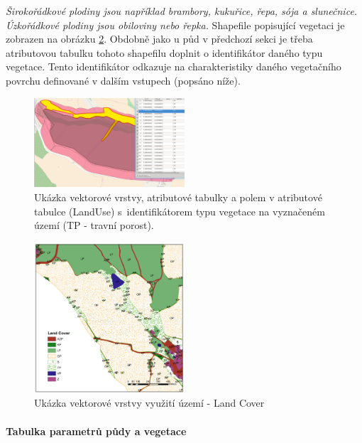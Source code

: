 \textit{Širokořádkové plodiny jsou například brambory, kukuřice, řepa, sója a slunečnice. Úzkořádkové plodiny jsou obiloviny nebo řepka.}
Shapefile popisující vegetaci je zobrazen na obrázku \ref{fig:bykovicevegetace}. Obdobně jako u půd v předchozí sekci je třeba atributovou tabulku tohoto shapefilu doplnit o identifikátor daného typu vegetace. Tento identifikátor odkazuje na charakteristiky daného vegetačního povrchu definované v dalším vstupech (popsáno níže).
\begin{figure}
  \centering
  \includegraphics[width=0.5\textwidth]{./img/lu.png}
  \caption{Ukázka vektorové vrstvy, atributové tabulky a polem v atributové tabulce (LandUse) s~identifikátorem typu vegetace na vyznačeném území (TP - travní porost).}
  \label{fig:bykovicevegetace}
\end{figure}

\begin{figure}
  \centering
  \includegraphics[width=0.5\textwidth]{./img/LandCover.png}
  \caption{Ukázka vektorové vrstvy využití území -  Land Cover}
  \label{fig:bykovicevegetace}
\end{figure}



\paragraph{Tabulka parametrů půdy a vegetace}  \label{sec:upravatabulkyparametru}

